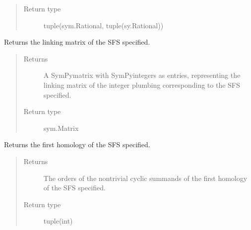 \documentclass[letterpaper,10pt,english]{sphinxmanual}
\begin{document}
\begin{fulllineitems}
\begin{fulllineitems}
\begin{quote}
\begin{description}
\item[{Return type}] \leavevmode
\sphinxAtStartPar
tuple(sym.Rational, tuple(sy.Rational))

\end{description}\end{quote}

\end{fulllineitems}


\begin{fulllineitems}
\label{\detokenize{soapy:soapy.SFS.linking_matrix}}
\sphinxAtStartPar
Returns the linking matrix of the SFS specified.
\begin{quote}\begin{description}
\item[{Returns}] \leavevmode
\sphinxAtStartPar
A SymPy\sphinxhyphen{}matrix with SymPy\sphinxhyphen{}integers as entries, representing the linking matrix of the integer plumbing corresponding to the SFS specified.

\item[{Return type}] \leavevmode
\sphinxAtStartPar
sym.Matrix

\end{description}\end{quote}

\end{fulllineitems}


\begin{fulllineitems}
\label{\detokenize{soapy:soapy.SFS.first_homology}}
\sphinxAtStartPar
Returns the first homology of the SFS specified.
\begin{quote}\begin{description}
\item[{Returns}] \leavevmode
\sphinxAtStartPar
The orders of the non\sphinxhyphen{}trivial cyclic summands of the first homology of the SFS specified.

\item[{Return type}] \leavevmode
\sphinxAtStartPar
tuple(int)

\end{description}\end{quote}


\end{fulllineitems}
\end{fulllineitems}
\end{document}
